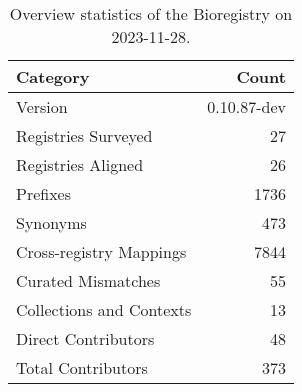 \begin{table}
\caption{Overview statistics of the Bioregistry on 2023-11-28.}
\label{tab:bioregistry-summary}
\begin{tabular}{lr}
\toprule
Category & Count \\
\midrule
Version & 0.10.87-dev \\
Registries Surveyed & 27 \\
Registries Aligned & 26 \\
Prefixes & 1736 \\
Synonyms & 473 \\
Cross-registry Mappings & 7844 \\
Curated Mismatches & 55 \\
Collections and Contexts & 13 \\
Direct Contributors & 48 \\
Total Contributors & 373 \\
\bottomrule
\end{tabular}
\end{table}
